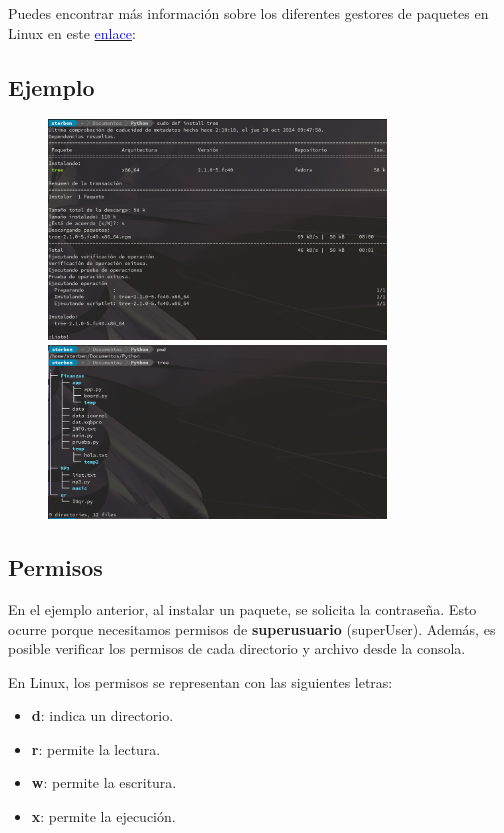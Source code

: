 Puedes encontrar más información sobre los diferentes gestores de paquetes en Linux en este 
\href{https://www.profesionalreview.com/2016/09/11/gestor-de-paquetes-en-linux/#:~:text=DNF%20es%20el%20gestor%20de,en%20CentOS%20en%20el%20futuro.&text=Probando%20los%20diferentes%20gestores%20de,que%20te%20resulte%20m%C3%A1s%20c%C3%B3modo.}{\textcolor{blue}{enlace}}:

\subsection*{Ejemplo}
\begin{figure}[h!]
    \centering
    \includegraphics[width=0.8\textwidth]{img/visuali1.png}
    \includegraphics[width=0.8\textwidth]{img/visuali2.png}
\end{figure}

\subsection{Permisos}
En el ejemplo anterior, al instalar un paquete, se solicita la contraseña. Esto ocurre porque necesitamos permisos de \textbf{superusuario} (superUser). Además, es posible verificar los permisos de cada directorio y archivo desde la consola.

En Linux, los permisos se representan con las siguientes letras:
\begin{itemize}
    \item \textbf{d}: indica un directorio.
    \item \textbf{r}: permite la lectura.
    \item \textbf{w}: permite la escritura.
    \item \textbf{x}: permite la ejecución.
\end{itemize}

